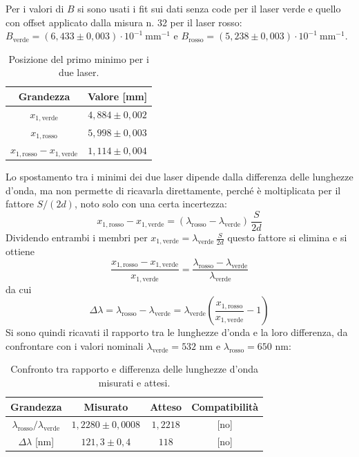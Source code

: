 \documentclass[10pt,twocolumn]{article}
\begin{document}
\noindent
Per i valori di $B$ si sono usati i fit sui dati senza code per il laser verde e quello con offset applicato dalla misura n. 32
per il laser rosso:
$B_{\mathrm{verde}} = (6{,}433 \pm 0{,}003)\cdot 10^{-1}\ \text{mm}^{-1}$ e
$B_{\mathrm{rosso}} = (5{,}238 \pm 0{,}003)\cdot 10^{-1}\ \text{mm}^{-1}$.

\begin{table}[H]
  \centering
  \small
  \begin{tabular}{cc}
    \toprule
    Grandezza & Valore [mm] \\
    \midrule
    $x_{1,\mathrm{verde}}$ & $4{,}884 \pm 0{,}002$ \\
    $x_{1,\mathrm{rosso}}$ & $5{,}998 \pm 0{,}003$ \\
    $x_{1,\mathrm{rosso}} - x_{1,\mathrm{verde}}$ & $1{,}114 \pm 0{,}004$ \\
    \bottomrule
  \end{tabular}
  \caption{Posizione del primo minimo per i due laser.}
  \label{tab:minimi}
\end{table}

\noindent
Lo spostamento tra i minimi dei due laser dipende dalla differenza delle lunghezze d'onda, ma non permette di ricavarla
direttamente, perché è moltiplicata per il fattore $S/(2d)$, noto solo con una certa incertezza:
\begin{equation}
  x_{1,\mathrm{rosso}} - x_{1,\mathrm{verde}} = (\lambda_{\mathrm{rosso}} - \lambda_{\mathrm{verde}})\,\frac{S}{2d}
\end{equation}
Dividendo entrambi i membri per $x_{1,\mathrm{verde}} = \lambda_{\mathrm{verde}}\,\frac{S}{2d}$ questo fattore si elimina e si ottiene
\begin{equation}
  \frac{x_{1,\mathrm{rosso}} - x_{1,\mathrm{verde}}}{x_{1,\mathrm{verde}}}
  = \frac{\lambda_{\mathrm{rosso}} - \lambda_{\mathrm{verde}}}{\lambda_{\mathrm{verde}}}
\end{equation}
da cui
\begin{equation}
  \Delta\lambda = \lambda_{\mathrm{rosso}} - \lambda_{\mathrm{verde}}
  = \lambda_{\mathrm{verde}}\left(\frac{x_{1,\mathrm{rosso}}}{x_{1,\mathrm{verde}}} - 1\right)
\end{equation}
Si sono quindi ricavati il rapporto tra le lunghezze d'onda e la loro differenza, da confrontare con i valori nominali
$\lambda_{\mathrm{verde}} = 532$ nm e $\lambda_{\mathrm{rosso}} = 650$ nm:

\begin{table}[H]
  \centering
  \small
  \begin{tabular}{cccc}
    \toprule
    Grandezza & Misurato & Atteso & Compatibilità \\
    \midrule
    $\lambda_{\mathrm{rosso}}/\lambda_{\mathrm{verde}}$ & $1{,}2280 \pm 0{,}0008$ & $1{,}2218$ & [no] \\
    $\Delta\lambda$ [nm] & $121{,}3 \pm 0{,}4$ & $118$ & [no] \\
    \bottomrule
  \end{tabular}
  \caption{Confronto tra rapporto e differenza delle lunghezze d'onda misurati e attesi.}
  \label{tab:confronto_lambda}
\end{table}
\end{document}

